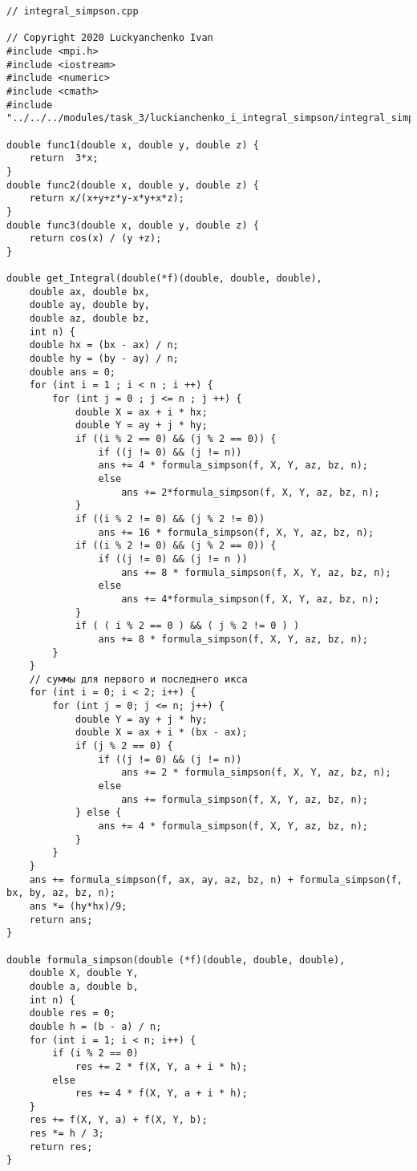 \documentclass{report}
\begin{document}
\begin{lstlisting}
// integral_simpson.cpp

// Copyright 2020 Luckyanchenko Ivan
#include <mpi.h>
#include <iostream>
#include <numeric>
#include <cmath>
#include "../../../modules/task_3/luckianchenko_i_integral_simpson/integral_simpson.h"

double func1(double x, double y, double z) {
    return  3*x;
}
double func2(double x, double y, double z) {
    return x/(x+y+z*y-x*y+x*z);
}
double func3(double x, double y, double z) {
    return cos(x) / (y +z);
}

double get_Integral(double(*f)(double, double, double),
    double ax, double bx,
    double ay, double by,
    double az, double bz,
    int n) {
    double hx = (bx - ax) / n;
    double hy = (by - ay) / n;
    double ans = 0;
    for (int i = 1 ; i < n ; i ++) {
        for (int j = 0 ; j <= n ; j ++) {
            double X = ax + i * hx;
            double Y = ay + j * hy;
            if ((i % 2 == 0) && (j % 2 == 0)) {
                if ((j != 0) && (j != n))
                ans += 4 * formula_simpson(f, X, Y, az, bz, n);
                else
                    ans += 2*formula_simpson(f, X, Y, az, bz, n);
            }
            if ((i % 2 != 0) && (j % 2 != 0))
                ans += 16 * formula_simpson(f, X, Y, az, bz, n);
            if ((i % 2 != 0) && (j % 2 == 0)) {
                if ((j != 0) && (j != n ))
                    ans += 8 * formula_simpson(f, X, Y, az, bz, n);
                else
                    ans += 4*formula_simpson(f, X, Y, az, bz, n);
            }
            if ( ( i % 2 == 0 ) && ( j % 2 != 0 ) )
                ans += 8 * formula_simpson(f, X, Y, az, bz, n);
        }
    }
    // суммы для первого и последнего икса
    for (int i = 0; i < 2; i++) {
        for (int j = 0; j <= n; j++) {
            double Y = ay + j * hy;
            double X = ax + i * (bx - ax);
            if (j % 2 == 0) {
                if ((j != 0) && (j != n))
                    ans += 2 * formula_simpson(f, X, Y, az, bz, n);
                else
                    ans += formula_simpson(f, X, Y, az, bz, n);
            } else {
                ans += 4 * formula_simpson(f, X, Y, az, bz, n);
            }
        }
    }
    ans += formula_simpson(f, ax, ay, az, bz, n) + formula_simpson(f, bx, by, az, bz, n);
    ans *= (hy*hx)/9;
    return ans;
}

double formula_simpson(double (*f)(double, double, double),
    double X, double Y,
    double a, double b,
    int n) {
    double res = 0;
    double h = (b - a) / n;
    for (int i = 1; i < n; i++) {
        if (i % 2 == 0)
            res += 2 * f(X, Y, a + i * h);
        else
            res += 4 * f(X, Y, a + i * h);
    }
    res += f(X, Y, a) + f(X, Y, b);
    res *= h / 3;
    return res;
}


\end{lstlisting}
\end{document}
